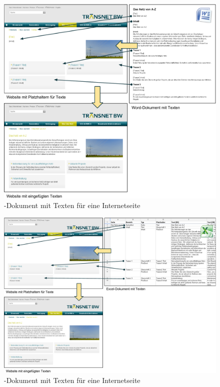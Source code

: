 \begin{figure}[htb]
\begin{center}
\includegraphics[width=\textwidth]{media/Textbooklet-Word-Dokument.pdf}
\end{center}
\caption{-Dokument mit Texten für eine Internetseite}
\label{f:wordbooklet}
\end{figure}

\begin{figure}[htb]
\begin{center}
\includegraphics[width=\textwidth]{media/Textbooklet-Excel-Dokument.pdf}
\end{center}
\caption{-Dokument mit Texten für eine Internetseite}
\label{f:excelbooklet}
\end{figure}

